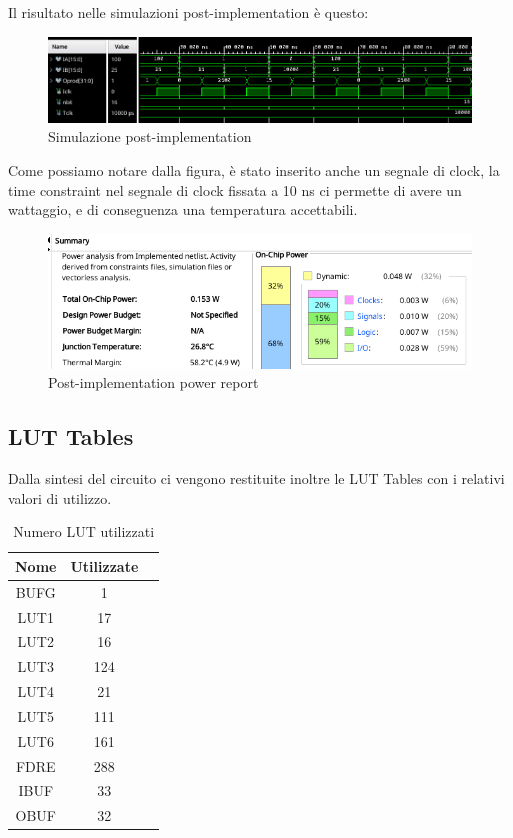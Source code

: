 Il risultato nelle simulazioni post-implementation è questo:
\begin{figure}[ht]
  \centering
  \includegraphics[width=1\textwidth]{assets/simulation.png}
  \caption{Simulazione post-implementation}
\end{figure}
Come possiamo notare dalla figura, è stato inserito anche un segnale di clock, la time constraint nel segnale di clock fissata a 10 ns ci permette di avere un wattaggio, e di conseguenza una temperatura accettabili.
\begin{figure}[ht]
  \centering
  \includegraphics[width=1\textwidth]{assets/power.png}
  \caption{Post-implementation power report}
\end{figure}

\clearpage
\subsection{LUT Tables}
Dalla sintesi del circuito ci vengono restituite inoltre le LUT Tables con i relativi valori di utilizzo.

\begin{table}[ht]
      \centering
      \begin{tabular}{|c|c|c|}
        \hline
        Nome & Utilizzate \\ \hline
        BUFG & 1 \\ \hline
        LUT1 & 17 \\ \hline
        LUT2 & 16 \\ \hline
        LUT3 & 124 \\ \hline
        LUT4 & 21  \\ \hline
        LUT5 & 111 \\ \hline
        LUT6 & 161 \\ \hline
        FDRE & 288 \\ \hline
        IBUF & 33 \\ \hline
        OBUF & 32 \\ \hline
      \end{tabular}
      \caption{Numero LUT utilizzati}
\end{table}

